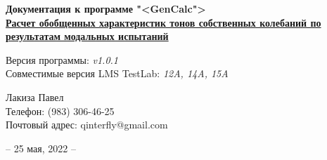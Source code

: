 %
%

\begin{titlepage}
\newpage
\large

\null
\vfill
\vfill
\begin{center}
	\textbf{Документация к программе "<GenCalc">} \\
	\textbf{\uline{Расчет обобщенных характеристик тонов собственных колебаний по результатам модальных испытаний}} \\
\end{center}

\vspace{2em}
\begin{flushleft}
	Версия программы: \emph{v1.0.1} \\
	Совместимые версия LMS TestLab: \emph{12A, 14A, 15A} \\
\end{flushleft}

\vfill
\begin{flushright}
	Лакиза Павел \\
	Телефон: (983) 306-46-25 \\
	Почтовый адрес: qinterfly@gmail.com \\
\end{flushright}


\vfill
\begin{center}
	-- 25 мая, 2022 --
\end{center}

\end{titlepage}

%
